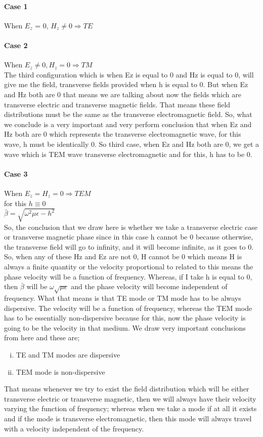 \paragraph{Case 1}When $E_z$ = 0, $H_z \neq 0 \Rightarrow TE$
\paragraph{Case 2}When $E_z \neq 0, H_z = 0 \Rightarrow TM$\\
The third configuration which is when Ez is equal to 0 and Hz is equal to 0, will give me the field, transverse fields provided when h is equal to 0. But when Ez and Hz both are 0 that means we are talking about now the fields which are transverse electric and transverse magnetic fields. That means these field distributions must be the same as the transverse electromagnetic field.
So, what we conclude is a very important and very perform conclusion that when Ez and Hz both are 0 which represents the transverse electromagnetic wave, for this wave, h must be identically 0. So third case, when Ez and Hz both are 0, we get a wave which is TEM wave transverse electromagnetic and for this, h has to be 0.
\paragraph{Case 3}When $E_z = H_z = 0 \Rightarrow TEM$\\
for this $h \equiv 0$\\
$\bar{\beta} = \sqrt{\omega^2\mu\epsilon - h^2}$ \\
So, the conclusion that we draw here is whether we take a transverse electric case or transverse magnetic phase since in this case h cannot be 0 because otherwise, the transverse field will go to infinity, and it will become infinite, as it goes to 0. So, when any of these Hz and Ez are not 0, H cannot be 0 which means H is always a finite quantity or the velocity proportional to related to this means the phase velocity will be a function of frequency. Whereas, if I take h is equal to 0, then $\bar{\beta}$ will be $\omega \sqrt{\mu\epsilon}$ and the phase velocity will become independent of frequency. What that means is that TE mode or TM mode has to be always dispersive. The velocity will be a function of frequency, whereas the TEM mode has to be essentially non-dispersive because for this, now the phase velocity is going to be the velocity in that medium. We draw very important conclusions from here and these are;
\begin{enumerate}[(i)]
\item TE and TM modes are dispersive
\item TEM mode is non-dispersive
\end{enumerate}
That means whenever we try to exist the field distribution which will be either transverse electric or transverse magnetic, then we will always have their velocity varying the function of frequency; whereas when we take a mode if at all it exists and if the mode is transverse electromagnetic, then this mode will always travel with a velocity independent of the frequency.

